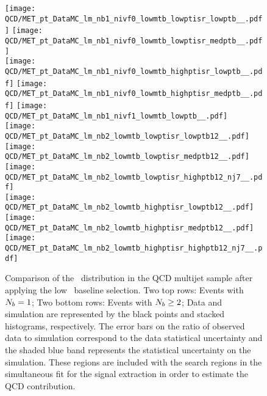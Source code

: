 \begin{figure}[!htb]
	\begin{center}  
		\texttt{[image: QCD/MET\_pt\_DataMC\_lm\_nb1\_nivf0\_lowmtb\_lowptisr\_lowptb\_\_.pdf]}
		\texttt{[image: QCD/MET\_pt\_DataMC\_lm\_nb1\_nivf0\_lowmtb\_lowptisr\_medptb\_\_.pdf]} \\
		\texttt{[image: QCD/MET\_pt\_DataMC\_lm\_nb1\_nivf0\_lowmtb\_highptisr\_lowptb\_\_.pdf]}
		\texttt{[image: QCD/MET\_pt\_DataMC\_lm\_nb1\_nivf0\_lowmtb\_highptisr\_medptb\_\_.pdf]}
		\texttt{[image: QCD/MET\_pt\_DataMC\_lm\_nb1\_nivf1\_lowmtb\_lowptb\_\_.pdf]} \\
		\texttt{[image: QCD/MET\_pt\_DataMC\_lm\_nb2\_lowmtb\_lowptisr\_lowptb12\_\_.pdf]} 
		\texttt{[image: QCD/MET\_pt\_DataMC\_lm\_nb2\_lowmtb\_lowptisr\_medptb12\_\_.pdf]}
		\texttt{[image: QCD/MET\_pt\_DataMC\_lm\_nb2\_lowmtb\_lowptisr\_highptb12\_nj7\_\_.pdf]} \\
		\texttt{[image: QCD/MET\_pt\_DataMC\_lm\_nb2\_lowmtb\_highptisr\_lowptb12\_\_.pdf]} 
		\texttt{[image: QCD/MET\_pt\_DataMC\_lm\_nb2\_lowmtb\_highptisr\_medptb12\_\_.pdf]}
		\texttt{[image: QCD/MET\_pt\_DataMC\_lm\_nb2\_lowmtb\_highptisr\_highptb12\_nj7\_\_.pdf]} \\
	\end{center}
	\caption[QCD Multijet LM Control Region $\nb=1$]{Comparison of the \met~distribution in the QCD multijet sample after applying the low \dm~baseline selection. Two top rows: Events with $\nb=1$; Two bottom rows: Events with $N_{b} \geq2$;  Data and simulation are represented by the black points and stacked histograms, respectively. The error bars on the ratio of observed data to simulation correspond to the data statistical uncertainty and the shaded blue band represents the statistical uncertainty on the simulation. These regions are included with the search regions in the simultaneous fit for the signal extraction in order to estimate the QCD contribution.
	 }
	\label{fig:qcd-cr-datavsmc-lm-nb1}
\end{figure}
